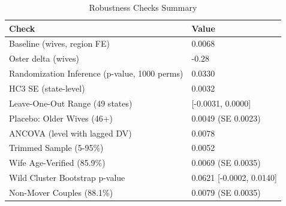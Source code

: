 \begin{table}
\centering
\caption{\label{tab:robustness}Robustness Checks Summary}
\centering
\begin{tabular}[t]{ll}
\toprule
Check & Value\\
\midrule
Baseline (wives, region FE) & 0.0068\\
Oster delta (wives) & -0.28\\
Randomization Inference (p-value, 1000 perms) & 0.0330\\
HC3 SE (state-level) & 0.0032\\
Leave-One-Out Range (49 states) & {}[-0.0031, 0.0000]\\
\addlinespace
Placebo: Older Wives (46+) & 0.0049 (SE 0.0023)\\
ANCOVA (level with lagged DV) & 0.0078\\
Trimmed Sample (5-95\%) & 0.0052\\
Wife Age-Verified (85.9\%) & 0.0069 (SE 0.0035)\\
Wild Cluster Bootstrap p-value & 0.0621 [-0.0002, 0.0140]\\
\addlinespace
Non-Mover Couples (88.1\%) & 0.0079 (SE 0.0035)\\
\bottomrule
\end{tabular}
\end{table}
